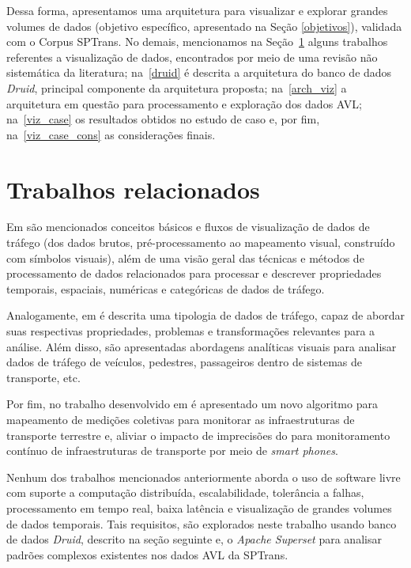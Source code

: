 \documentclass[
	12pt,				%
	oneside,			%
	a4paper,			%
	english,			%
	brazil				%
	]{abntex2ppgsi}
\begin{document}
{{{Dessa forma, apresentamos uma arquitetura para visualizar e explorar grandes volumes de dados (objetivo específico, apresentado na Seção \ref{objetivos}), validada com o Corpus SPTrans.  No demais, mencionamos na Seção~\ref{related_work_data_viz} alguns trabalhos referentes a visualização de dados, encontrados por meio de uma revisão não sistemática da literatura; na~\ref{druid} é descrita a arquitetura do banco de dados \textit{Druid}, principal componente da arquitetura proposta; na~\ref{arch_viz} a arquitetura em questão para processamento e exploração dos dados AVL; na~\ref{viz_case} os resultados obtidos no estudo de caso e, por fim, na~\ref{viz_case_cons} as considerações finais.

\section{Trabalhos relacionados}
\label{related_work_data_viz}

Em \cite{chen2015survey} são mencionados conceitos básicos e fluxos de visualização de dados de tráfego (dos dados brutos, pré-processamento ao mapeamento visual, construído com símbolos visuais), além de uma visão geral das técnicas e métodos de processamento de dados relacionados para processar e descrever propriedades temporais, espaciais, numéricas e categóricas de dados de tráfego.

Analogamente, em \cite{andrienko2017visual} é descrita uma tipologia de dados de tráfego, capaz de abordar suas respectivas propriedades, problemas e transformações relevantes para a análise. Além disso, são apresentadas abordagens analíticas visuais para analisar dados de tráfego de veículos, pedestres, passageiros dentro de sistemas de transporte, etc.

Por fim, no trabalho desenvolvido em \cite{seraj2017aggregation} é apresentado um novo algoritmo para mapeamento de medições coletivas para monitorar as infraestruturas de transporte terrestre e, aliviar o impacto de imprecisões do  para monitoramento contínuo de infraestruturas de transporte por meio de \textit{smart phones}.

Nenhum dos trabalhos mencionados anteriormente aborda o uso de software livre com suporte a computação distribuída, escalabilidade, tolerância a falhas, processamento em tempo real, baixa latência e visualização de grandes volumes de dados temporais. Tais requisitos, são explorados neste trabalho usando banco de dados \textit{Druid}, descrito na seção seguinte e, o \textit{Apache Superset} para analisar padrões complexos existentes nos dados AVL da SPTrans.

}}}
\end{document}
